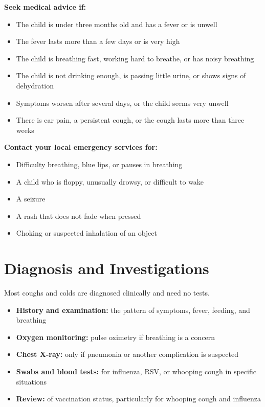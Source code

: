 \textbf{Seek medical advice if:}
\begin{itemize}
    \item The child is under three months old and has a fever or is unwell
    \item The fever lasts more than a few days or is very high
    \item The child is breathing fast, working hard to breathe, or has noisy breathing
    \item The child is not drinking enough, is passing little urine, or shows signs of dehydration
    \item Symptoms worsen after several days, or the child seems very unwell
    \item There is ear pain, a persistent cough, or the cough lasts more than three weeks
\end{itemize}

\textbf{Contact your local emergency services for:}
\begin{itemize}
    \item Difficulty breathing, blue lips, or pauses in breathing
    \item A child who is floppy, unusually drowsy, or difficult to wake
    \item A seizure
    \item A rash that does not fade when pressed
    \item Choking or suspected inhalation of an object
\end{itemize}

\section*{Diagnosis and Investigations}
Most coughs and colds are diagnosed clinically and need no tests.

\begin{itemize}
    \item \textbf{History and examination:} the pattern of symptoms, fever, feeding, and breathing
    \item \textbf{Oxygen monitoring:} pulse oximetry if breathing is a concern
    \item \textbf{Chest X-ray:} only if pneumonia or another complication is suspected
    \item \textbf{Swabs and blood tests:} for influenza, RSV, or whooping cough in specific situations
    \item \textbf{Review:} of vaccination status, particularly for whooping cough and influenza
\end{itemize}

